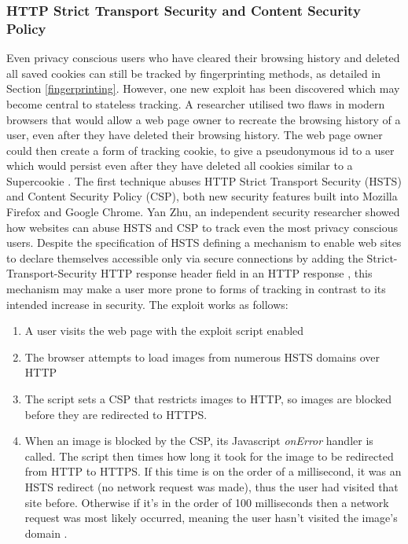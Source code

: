 \documentclass[12pt]{article}
\begin{document}
\subsubsection{HTTP Strict Transport Security and Content Security Policy}
Even privacy conscious users who have cleared their browsing history and deleted all saved cookies can still be tracked by fingerprinting methods, as detailed in Section \ref{fingerprinting}. However, one new exploit has been discovered which may become central to stateless tracking. A researcher utilised two flaws in modern browsers that would allow a web page owner to recreate the browsing history of a user, even after they have deleted their browsing history. The web page owner could then create a form of tracking cookie, to give a pseudonymous id to a user which would persist even after they have deleted all cookies similar to a Supercookie \parencite{newTracking}. The first technique abuses HTTP Strict Transport Security (HSTS) and Content Security Policy (CSP), both new security features built into Mozilla Firefox and Google Chrome. Yan Zhu, an independent security researcher showed how websites can abuse HSTS and CSP to track even the most privacy conscious users. Despite the specification of HSTS defining a mechanism to enable web sites to declare themselves accessible only via secure connections by adding the Strict-Transport-Security HTTP response header field in an HTTP response \parencite{HSTS}, this mechanism may make a user more prone to forms of tracking in contrast to its intended increase in security. The exploit works as follows: 

\begin{enumerate}
    \item A user visits the web page with the exploit script enabled
    \item The browser attempts to load images from numerous HSTS domains over HTTP
    \item The script sets a CSP that restricts images to HTTP, so images are blocked before they are redirected to HTTPS. 
    \item When an image is blocked by the CSP, its Javascript \textit{onError} handler is called. The script then times how long it took for the image to be redirected from HTTP to HTTPS. If this time is on the order of a millisecond, it was an HSTS redirect (no network request was made), thus the user had visited that site before. Otherwise if it's in the order of 100 milliseconds then a network request was most likely occurred, meaning the user hasn't visited the image's domain \parencite{gitSniffly}. 
\end{enumerate} 
\end{document}
